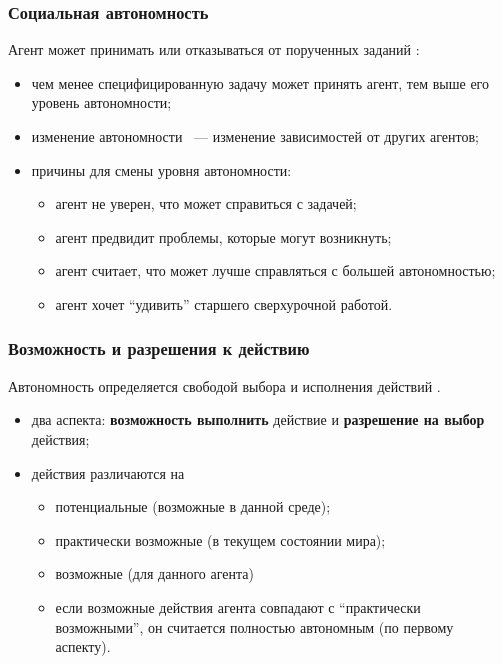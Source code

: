 \documentclass{beamer}
\begin{document}
\begin{frame}
  \frametitle{Социальная автономность}
  Агент может принимать или отказываться от порученных заданий \cite{Falcone2001}:
  \begin{itemize}
    \item чем менее специфицированную задачу может принять агент, тем выше его уровень автономности;
    \item изменение автономности ~--- изменение зависимостей от других агентов;
    \item причины для смены уровня автономности:
      \begin{itemize}
        \item агент не уверен, что может справиться с задачей;
        \item агент предвидит проблемы, которые могут возникнуть;
        \item агент считает, что может лучше справляться с большей автономностью;
        \item агент хочет ``удивить'' старшего сверхурочной работой.
      \end{itemize}
  \end{itemize}
\end{frame}

\begin{frame}
  \frametitle{Возможность и разрешения к действию}
  Автономность определяется свободой выбора и исполнения действий \cite{Bradshaw2004}.
  \begin{itemize}
    \item два аспекта: {\bf возможность выполнить} действие и {\bf разрешение на выбор} действия;
    \item действия различаются на
      \begin{itemize}
        \item потенциальные (возможные в данной среде);
        \item практически возможные (в текущем состоянии мира);
        \item возможные (для данного агента)
        \item если возможные действия агента совпадают с ``практически возможными'',
          он считается полностью автономным (по первому аспекту).
      \end{itemize}
  \end{itemize}
\end{frame}
\end{document}
